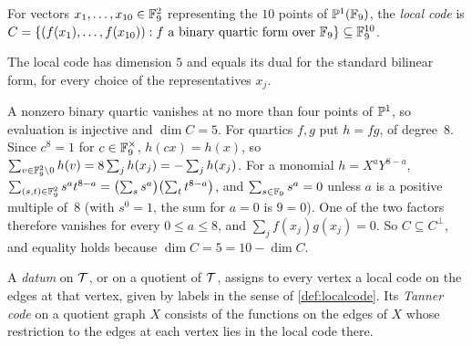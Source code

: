 \begin{definition}\label{def:localcode}
For vectors $x_1,\dots,x_{10}\in\mathbb{F}_9^2$ representing the $10$ points of $\mathbb{P}^1(\mathbb{F}_9)$, the \emph{local code} is
$C=\{(f(x_1),\dots,f(x_{10})): f\text{ a binary quartic form over }\mathbb{F}_9\}\subseteq\mathbb{F}_9^{10}$.
\end{definition}

\begin{lemma}\label{lem:selfdual}
\notformalized
The local code has dimension $5$ and equals its dual for the standard bilinear form, for every choice of the
representatives $x_j$.
\end{lemma}
\begin{informalproof}
A nonzero binary quartic vanishes at no more than four points of $\mathbb{P}^1$, so evaluation is injective and $\dim C=5$. For
quartics $f,g$ put $h=fg$, of degree~$8$. Since $c^8=1$ for $c\in\mathbb{F}_9^\times$, $h(cx)=h(x)$, so
$\sum_{v\in\mathbb{F}_9^2\setminus0}h(v)=8\sum_jh(x_j)=-\sum_jh(x_j)$. For a monomial $h=X^aY^{8-a}$,
$\sum_{(s,t)\in\mathbb{F}_9^2}s^at^{8-a}=\bigl(\sum_ss^a\bigr)\bigl(\sum_tt^{8-a}\bigr)$, and $\sum_{s\in\mathbb{F}_9}s^a=0$ unless $a$ is a
positive multiple of~$8$ (with $s^0=1$, the sum for $a=0$ is $9=0$). One of the two factors therefore vanishes for every
$0\le a\le8$, and $\sum_jf(x_j)g(x_j)=0$. So $C\subseteq C^\perp$, and equality holds because $\dim C=5=10-\dim C$.
\end{informalproof}

A \emph{datum} on $\mathcal{T}$, or on a quotient of $\mathcal{T}$, assigns to every vertex a local code on the edges at that vertex,
given by labels in the sense of \cref{def:localcode}. Its \emph{Tanner code} on a quotient graph $X$ consists of the
functions on the edges of $X$ whose restriction to the edges at each vertex lies in the local code there.

